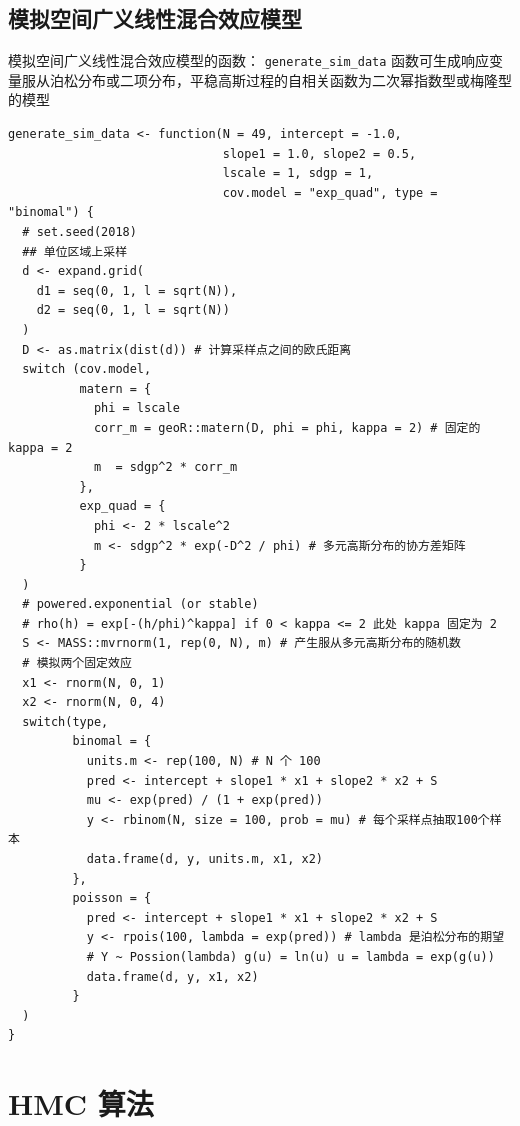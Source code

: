 \documentclass[12pt,a4paper,UTF8,twoside]{book}
\theoremstyle{definition}
\theoremstyle{definition}
\theoremstyle{definition}
\theoremstyle{remark}
\begin{document}
\hypertarget{simulate-SGLMM-code}{%
\subsection{模拟空间广义线性混合效应模型}\label{simulate-SGLMM-code}}

模拟空间广义线性混合效应模型的函数： \texttt{generate\_sim\_data}
函数可生成响应变量服从泊松分布或二项分布，平稳高斯过程的自相关函数为二次幂指数型或梅隆型的模型

\begin{verbatim}
generate_sim_data <- function(N = 49, intercept = -1.0, 
                              slope1 = 1.0, slope2 = 0.5,
                              lscale = 1, sdgp = 1, 
                              cov.model = "exp_quad", type = "binomal") {
  # set.seed(2018) 
  ## 单位区域上采样
  d <- expand.grid(
    d1 = seq(0, 1, l = sqrt(N)),
    d2 = seq(0, 1, l = sqrt(N))
  )
  D <- as.matrix(dist(d)) # 计算采样点之间的欧氏距离
  switch (cov.model,
          matern = {
            phi = lscale
            corr_m = geoR::matern(D, phi = phi, kappa = 2) # 固定的 kappa = 2 
            m  = sdgp^2 * corr_m 
          },
          exp_quad = {
            phi <- 2 * lscale^2
            m <- sdgp^2 * exp(-D^2 / phi) # 多元高斯分布的协方差矩阵
          }
  )
  # powered.exponential (or stable)
  # rho(h) = exp[-(h/phi)^kappa] if 0 < kappa <= 2 此处 kappa 固定为 2
  S <- MASS::mvrnorm(1, rep(0, N), m) # 产生服从多元高斯分布的随机数
  # 模拟两个固定效应
  x1 <- rnorm(N, 0, 1)
  x2 <- rnorm(N, 0, 4)
  switch(type,
         binomal = {
           units.m <- rep(100, N) # N 个 100
           pred <- intercept + slope1 * x1 + slope2 * x2 + S
           mu <- exp(pred) / (1 + exp(pred))
           y <- rbinom(N, size = 100, prob = mu) # 每个采样点抽取100个样本
           data.frame(d, y, units.m, x1, x2)
         },
         poisson = {
           pred <- intercept + slope1 * x1 + slope2 * x2 + S
           y <- rpois(100, lambda = exp(pred)) # lambda 是泊松分布的期望  
           # Y ~ Possion(lambda) g(u) = ln(u) u = lambda = exp(g(u))
           data.frame(d, y, x1, x2)
         }
  )
}
\end{verbatim}

\hypertarget{HMC-Algrithms}{%
\section*{HMC 算法}\label{HMC-Algrithms}}
\end{document}

